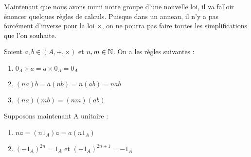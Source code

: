 Maintenant que nous avons muni notre groupe d'une nouvelle loi, il va falloir énoncer quelques règles de calculs. 
Puisque dans un anneau, il n'y a pas forcément d'inverse pour la loi $\times$, on ne pourra pas faire toutes les simplifications 
que l'on souhaite. 

\begin{prop}
    Soient $a,b \in (A,+,\times)$ et $n,m \in \mathbb{N}$. On a les règles suivantes :
    \begin{enumerate}[label=\roman*)]
        \item $0_A \times a  = a \times 0_A = 0_A $
        \item $(na)b = a(nb) = n(ab) = nab $
        \item $(na)(mb) = (nm)(ab)$
    \end{enumerate}
    Supposons maintenant A unitaire : 
    \begin{enumerate}[label=\roman*)]
        \item $na = (n1_A)a = a(n1_A)$ 
        \item $(-1_A)^{2n} = 1_A $ et $(-1_A)^{2n+1} = -1_A $
    \end{enumerate}
\end{prop}

